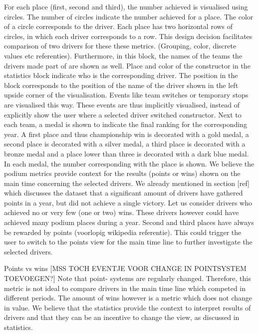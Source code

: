 \documentclass{sigchi}
\begin{document}
For each place (first, second and third), the number achieved is visualised using circles. The number of circles indicate the number achieved for a place. The color of a circle corresponds to the driver. Each place has two horizontal rows of circles, in which each driver corresponds to a row. This design decision facilitates comparison of two drivers for these these metrics. (Grouping, color, discrete values etc referenties). Furthermore, in this block, the names of the teams the drivers made part of are shown as well. Place and color of the constructor in the statistics block indicate who is the corresponding driver. The position in the block corresponds to the position of the name of the driver shown in the left upside corner of the visualisation.  Events like team switches or temporary stops are visualised this way. These events are thus implicitly visualised, instead of explicitly show the user where a selected driver switched constructor. Next to each team, a medal is shown to indicate the final ranking for the corresponding year. A first place and thus championship win is decorated with a gold medal, a second place is decorated with a silver medal, a third place is decorated with a bronze medal and a place lower than three is decorated with a dark blue medal. In each medal, the number corresponding with the place is shown. We believe the podium metrics provide context for the results (points or wins) shown on the main time concerning the selected drivers. We already mentioned in section [ref] which discusses the dataset that a significant amount of drivers have gathered points in a year, but did not achieve a single victory. Let us consider drivers who achieved no or very few (one or two) wins. These drivers however could have achieved many podium places during a year. Second and third places have always be rewarded by points (voorlopig wikipedia referentie). This could trigger the user to switch to the points view for the main time line to further investigate the selected drivers.

Points vs wins [MSS TOCH EVENTJE VOOR CHANGE IN POINTSYSTEM TOEVOEGEN?]
Note that point- systems are regularly changed. Therefore, this metric is not ideal to compare drivers in the main time line which competed in different periods. The amount of wins however is a metric which does not change in value. We believe that the statistics provide the context to interpret results of drivers and that they can be an incentive to change the view, as discussed in statistics. 
\end{document}

